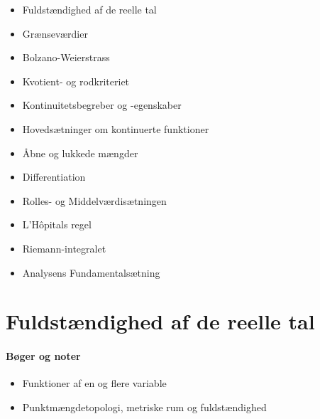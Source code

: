 %
%
%
%
%

\begin{itemize}
\item[\checkmark] Fuldstændighed af de reelle tal
\item[] Grænseværdier
\item[\checkmark] Bolzano-Weierstrass
\item[\checkmark] Kvotient- og rodkriteriet
\item[] Kontinuitetsbegreber og -egenskaber
\item[\checkmark] Hovedsætninger om kontinuerte funktioner
\item[\checkmark] Åbne og lukkede mængder
\item[\checkmark] Differentiation
\item[\checkmark] Rolles- og Middelværdisætningen
\item[\checkmark] L'Hôpitals regel
\item[\checkmark] Riemann-integralet
\item[\checkmark] Analysens Fundamentalsætning
\end{itemize}
\chapter{Fuldstændighed af de reelle tal}
\subsubsection{Bøger og noter}
\begin{itemize}
\setlength\itemsep{0em}
\item Funktioner af en og flere variable
\item Punktmængdetopologi, metriske rum og fuldstændighed
\end{itemize}

